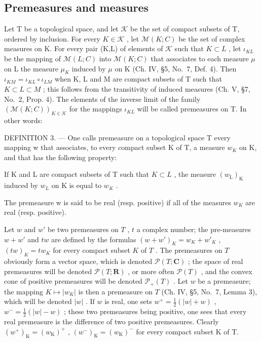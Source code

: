 \subsection{Premeasures and measures}

Let T be a topological space, and let \(\mathcal{K}\) be the set of compact subsets of T, ordered by inclusion. For every \(K\in\mathcal{K}\) , let \(\mathcal{M}(K;C)\) be the set of complex measures on K. For every pair (K,L) of elements of \(\mathcal{K}\) such that \(K\subset L\) , let \(\iota_{KL}\) be the mapping of \(\mathcal{M}(L;C)\) into \(\mathcal{M}(K;C)\) that associates to each measure \(\mu\) on L the measure \(\mu_{K}\) induced by \(\mu\) on K (Ch. IV, §5, No.~7, Def. 4). Then \(\iota_{KM}=\iota_{KL}\circ\iota_{LM}\) when K, L and M are compact subsets of T such that \(K\subset L\subset M\) ; this follows from the transitivity of induced measures (Ch. V, §7, No.~2, Prop. 4). The elements of the inverse limit of the family \((\mathcal{M}(K;C))_{K\in\mathcal{K}}\) for the mappings \(\iota_{KL}\) will be called premeasures on T. In other words:

DEFINITION 3. --- One calls premeasure on a topological space T every mapping w that associates, to every compact subset K of T, a measure \(w_{K}\) on K, and that has the following property:

If K and L are compact subsets of T such that \(K \subset L\) , the measure \((w_{\mathrm{L}})_{\mathrm{K}}\) induced by \(w_{L}\) on K is equal to \(w_{K}\) .

The premeasure w is said to be real (resp. positive) if all of the measures \(w_{K}\) are real (resp. positive).

Let \(w\) and \(w'\) be two premeasures on \(T\) , \(t\) a complex number; the pre-measures \(w + w'\) and \(tw\) are defined by the formulas \((w + w')_K = w_K + w'_K\) , \((tw)_K = tw_K\) for every compact subset \(K\) of \(T\) . The premeasures on \(T\) obviously form a vector space, which is denoted \(\mathcal{P}(T; \mathbf{C})\) ; the space of real premeasures will be denoted \(\mathcal{P}(T; \mathbf{R})\) , or more often \(\mathcal{P}(T)\) , and the convex cone of positive premeasures will be denoted \(\mathcal{P}_+(T)\) . Let \(w\) be a premeasure; the mapping \(K \mapsto |w_K|\) is then a premeasure on \(T\) (Ch. IV, §5, No.~7, Lemma 3), which will be denoted \(|w|\) . If \(w\) is real, one sets \(w^{+} = \frac{1}{2} (|w| + w)\) , \(w^{-} = \frac{1}{2} (|w| - w)\) ; these two premeasures being positive, one sees that every real premeasure is the difference of two positive premeasures. Clearly \((w^{+})_{\mathrm{K}} = (w_{\mathrm{K}})^{+}\) , \((w^{-})_{\mathrm{K}} = (w_{\mathrm{K}})^{-}\) for every compact subset K of T.

